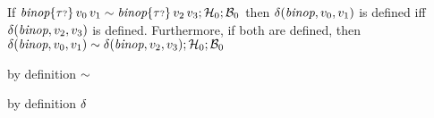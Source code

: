 \begin{lemma}\label{AT-binop}
  If\/ $\textit{binop}{\{{\tau{\scriptstyle ?}}\}}\,v_0\,v_1 \sim \textit{binop}{\{{\tau{\scriptstyle ?}}\}}\,v_2\,v_3; \mathcal{H}_0; \mathcal{B}_0$
  then\/ $\delta(\textit{binop}, v_0, v_1)$ is defined iff\/ $\delta(\textit{binop}, v_2, v_3)$
  is defined.
  Furthermore, if both are defined, then\/ $\delta(\textit{binop}, v_0, v_1) \sim \delta(\textit{binop}, v_2, v_3); \mathcal{H}_0; \mathcal{B}_0$
\end{lemma}
\begin{lamportproof}
    \begin{pfproof}
      by definition $\sim$
    \end{pfproof}

  \qedstep
    \begin{pfproof}
      by definition $\delta$
    \end{pfproof}
\end{lamportproof}

